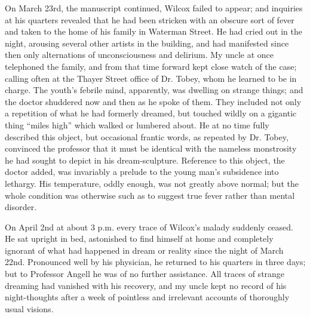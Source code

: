 On March 23rd, the manuscript continued, Wilcox failed to appear; and inquiries at his quarters revealed that he had been stricken with an obscure sort of fever and taken to the home of his family in Waterman Street. He had cried out in the night, arousing several other artists in the building, and had manifested since then only alternations of unconsciousness and delirium. My uncle at once telephoned the family, and from that time forward kept close watch of the case; calling often at the Thayer Street office of Dr. Tobey, whom he learned to be in charge. The youth’s febrile mind, apparently, was dwelling on strange things; and the doctor shuddered now and then as he spoke of them. They included not only a repetition of what he had formerly dreamed, but touched wildly on a gigantic thing “miles high” which walked or lumbered about. He at no time fully described this object, but occasional frantic words, as repeated by Dr. Tobey, convinced the professor that it must be identical with the nameless monstrosity he had sought to depict in his dream-sculpture. Reference to this object, the doctor added, was invariably a prelude to the young man’s subsidence into lethargy. His temperature, oddly enough, was not greatly above normal; but the whole condition was otherwise such as to suggest true fever rather than mental disorder.

On April 2nd at about 3 p.m. every trace of Wilcox’s malady suddenly ceased. He sat upright in bed, astonished to find himself at home and completely ignorant of what had happened in dream or reality since the night of March 22nd. Pronounced well by his physician, he returned to his quarters in three days; but to Professor Angell he was of no further assistance. All traces of strange dreaming had vanished with his recovery, and my uncle kept no record of his night-thoughts after a week of pointless and irrelevant accounts of thoroughly usual visions.

\sectionbreak

